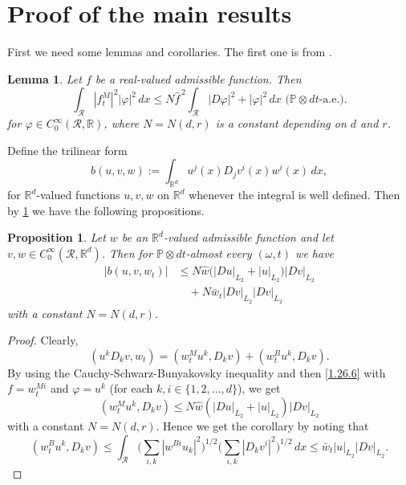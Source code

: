 \documentclass[11pt,reqno]{amsart}
\newcommand{\mysection}[1]{\section{#1}

      \setcounter{equation}{0}}
\newtheorem{lemma}[theorem]{Lemma}
\newtheorem{proposition}[theorem]{Proposition}
\theoremstyle{definition}
\theoremstyle{remark}
\newcommand\bR{\mathbb{R}}
\newcommand\cR{\mathcal{R}}
\newcommand{\<}{\langle}
\renewcommand{\>}{\rangle}
\newcommand{\R}{\mathbb{R}}
\renewcommand{\P}{\mathbb{P}}
\begin{document}
\mysection{Proof of the main results}


First we need some lemmas and corollaries. 
The first one is from \cite{K2022b}. 
\begin{lemma}
                                      \label{lemma k}
Let $f$ be a real-valued admissible function. Then
\begin{equation}
                                    \label{1.26.6}
\int_{\cR}|f_t^M|^2|\varphi|^2\,dx
\leq N\hat f^{\,2}\int_{\cR}|D\varphi|^2+|\varphi|^2\,dx
\,\, \text{$(\P\otimes dt$-a.e.}).
\end{equation}
 for $\varphi\in C_0^\infty(\cR,\bR)$, where
$N=N(d,r)$ is a constant depending on $d$ and $r$.
\end{lemma}
Define the trilinear form
\begin{equation*}
                                               \label{trilinear_form_definition}
b(u,v,w):=\int_{\bR^d}u^j(x)D_j v^i(x)w^i(x)\,dx,
\end{equation*}
for $\bR^d$-valued functions $u,v,w$ on $\bR^d$ 
whenever the integral is well defined. 
Then by \ref{lemma k} we have the following propositions. 
\begin{proposition}
                             \label{proposition1}
Let $w$ be an $\R^d$-valued admissible function and let
$v,w\in C_0^{\infty}(\cR,\bR^d)$. 
Then for $\P\otimes dt$-almost every $(\omega,t)$
we have 
\begin{align}
|b(u,v,w_t)|
&\leq N\hat w \big(|Du|_{L_2}+|u|_{L_2}\big)|Dv|_{L_2}  \nonumber\\
&\quad+N\bar w_t|Dv|_{L_2}|Dv|_{L_2}             \nonumber
\end{align}
with a constant $N=N(d,r)$. 
\end{proposition}

\begin{proof}
Clearly, 
$$
(u^{k}D_k v,w_t)= (w_t^M u^k,D_kv)+(w^B_t u^k,D_k v). 
$$
By using the Cauchy-Schwarz-Bunyakovsky inequality and then 
\eqref{1.26.6} with $f=w_t^{Mi}$ 
and $\varphi=u^k$ (for each $k,i\in\{1,2,...,d\}$), we get 
$$
(w^M_tu^k,D_kv)\leq N\hat w(|Du|_{L_2}
+|u|_{L_2})|Dv|_{L_2}
$$
with a constant $N=N(d,r)$. 
Hence we get the corollary by noting that 
$$
(w^B_tu^k,D_kv)\leq \int_{\cR} \big(\sum_{i,k}|w^{Bi}u_k|^2\big)^{1/2}
\big(\sum_{i,k}|D_kv^i|^2\big)^{1/2}\,dx\leq \bar w_t|u|_{L_2}|Dv|_{L_2}. 
$$
\end{proof}
\end{document}
